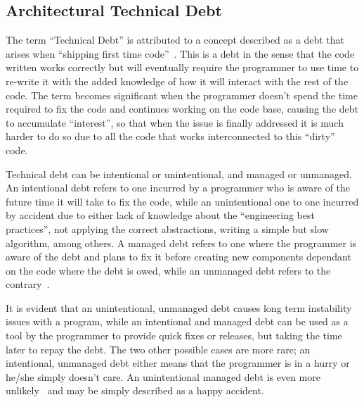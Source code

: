 \subsection{Architectural Technical Debt} \label{add:technical_debt}
The term ``Technical Debt'' is attributed to a concept described as a debt that arises when ``shipping first time code''~\cite{cunningham1992wycash}.
This is a debt in the sense that the code written works correctly but will eventually require the programmer to use time to re-write it with the added knowledge of how it will interact with the rest of the code.
The term becomes significant when the programmer doesn't spend the time required to fix the code and continues working on the code base, causing the debt to accumulate ``interest'', so that when the issue is finally addressed it is much harder to do so due to all the code that works interconnected to this ``dirty'' code.

Technical debt can be intentional or unintentional, and managed or unmanaged.
An intentional debt refers to one incurred by a programmer who is aware of the future time it will take to fix the code, while an unintentional one to one incurred by accident due to either lack of knowledge about the ``engineering best practices'', not applying the correct abstractions, writing a simple but slow algorithm, among others.
A managed debt refers to one where the programmer is aware of the debt and plans to fix it before creating new components dependant on the code where the debt is owed, while an unmanaged debt refers to the contrary~\cite{allman2012managing}.

It is evident that an unintentional, unmanaged debt causes long term instability issues with a program, while an intentional and managed debt can be used as a tool by the programmer to provide quick fixes or releases, but taking the time later to repay the debt.
The two other possible cases are more rare; an intentional, unmanaged debt either means that the programmer is in a hurry or he/she simply doesn't care.
An unintentional managed debt is even more unlikely~\cite{allman2012managing} and may be simply described as a happy accident.